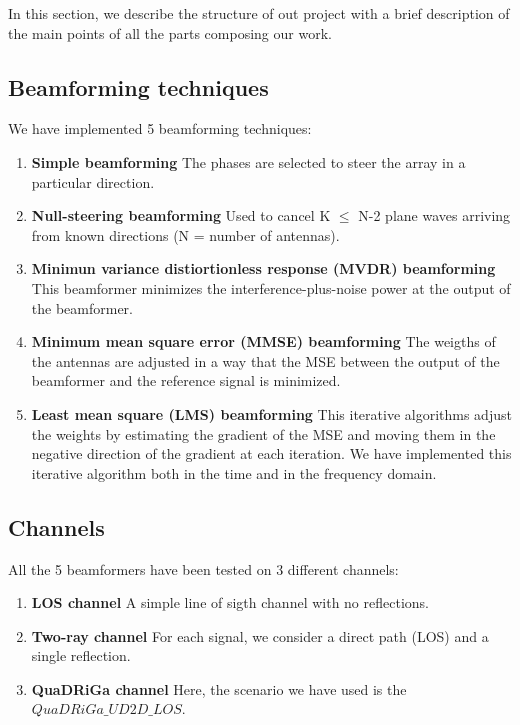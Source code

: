 In this section, we describe the structure of out project with a brief description of 
the main points of all the parts composing our work.

\subsection{Beamforming techniques}

We have implemented 5 beamforming techniques:

\begin{enumerate}
    \item \textbf{Simple beamforming} The phases are selected to steer the array in a particular direction.
    \item \textbf{Null-steering beamforming} Used to cancel K $\leq$ N-2 plane waves arriving from known directions (N = number of
                antennas).
    \item \textbf{Minimun variance distiortionless response (MVDR) beamforming} This beamformer minimizes the interference-plus-noise 
                power at the output of the beamformer. 
    \item \textbf{Minimum mean square error (MMSE) beamforming} The weigths of the antennas are adjusted in a way that the
            MSE between the output of the beamformer and the reference signal is minimized.
    \item \textbf{Least mean square (LMS) beamforming} This iterative algorithms adjust the weights by estimating the
            gradient of the MSE and moving them in the negative direction of the gradient at each iteration. We have 
            implemented this iterative algorithm both in the time and in the frequency domain.
\end{enumerate}

\subsection{Channels}

All the 5 beamformers have been tested on 3 different channels:

\begin{enumerate}
    \item \textbf{LOS channel} A simple line of sigth channel with no reflections.
    \item \textbf{Two-ray channel} For each signal, we consider a direct path (LOS) and a single reflection.
    \item \textbf{QuaDRiGa channel} Here, the scenario we have used is the $QuaDRiGa\_UD2D\_LOS$.
\end{enumerate}

